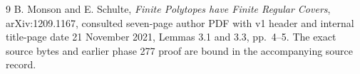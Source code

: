 \documentclass[11pt]{article}
\theoremstyle{remark}\newtheorem{remark}[theorem]{Remark}
\begin{document}
\begin{thebibliography}{9}
B. Monson and E. Schulte,
\emph{Finite Polytopes have Finite Regular Covers},
arXiv:1209.1167, consulted seven-page author PDF with v1 header and
internal title-page date 21 November 2021, Lemmas 3.1 and 3.3,
pp.~4--5. The exact source bytes and earlier phase 277 proof are bound
in the accompanying source record.
\end{thebibliography}
\end{document}

